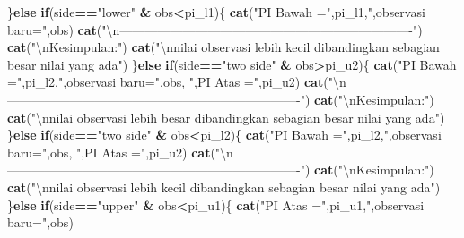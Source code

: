 \documentclass[]{book}
\newenvironment{Shaded}{\begin{snugshade}}{\end{snugshade}}
\newcommand{\KeywordTok}[1]{\textcolor[rgb]{0.13,0.29,0.53}{\textbf{#1}}}
\newcommand{\CharTok}[1]{\textcolor[rgb]{0.31,0.60,0.02}{#1}}
\newcommand{\StringTok}[1]{\textcolor[rgb]{0.31,0.60,0.02}{#1}}
\newcommand{\ControlFlowTok}[1]{\textcolor[rgb]{0.13,0.29,0.53}{\textbf{#1}}}
\newcommand{\OperatorTok}[1]{\textcolor[rgb]{0.81,0.36,0.00}{\textbf{#1}}}
\newcommand{\NormalTok}[1]{#1}
\begin{document}
\begin{Shaded}
\begin{Highlighting}[]
\NormalTok{  \}}\ControlFlowTok{else} \ControlFlowTok{if}\NormalTok{(side}\OperatorTok{==}\StringTok{"lower"} \OperatorTok{&}\StringTok{ }\NormalTok{obs}\OperatorTok{<}\NormalTok{pi_l1)\{}
    \KeywordTok{cat}\NormalTok{(}\StringTok{"PI Bawah ="}\NormalTok{,pi_l1,}\StringTok{",observasi baru="}\NormalTok{,obs)}
    \KeywordTok{cat}\NormalTok{(}\StringTok{"}\CharTok{\textbackslash{}n}\StringTok{----------------------------------------------------------------------"}\NormalTok{)}
    \KeywordTok{cat}\NormalTok{(}\StringTok{"}\CharTok{\textbackslash{}n}\StringTok{Kesimpulan:"}\NormalTok{)}
    \KeywordTok{cat}\NormalTok{(}\StringTok{"}\CharTok{\textbackslash{}n}\StringTok{nilai observasi lebih kecil dibandingkan sebagian besar nilai yang ada"}\NormalTok{)}
\NormalTok{  \}}\ControlFlowTok{else} \ControlFlowTok{if}\NormalTok{(side}\OperatorTok{==}\StringTok{"two side"} \OperatorTok{&}\StringTok{ }\NormalTok{obs}\OperatorTok{>}\NormalTok{pi_u2)\{}
    \KeywordTok{cat}\NormalTok{(}\StringTok{"PI Bawah ="}\NormalTok{,pi_l2,}\StringTok{",observasi baru="}\NormalTok{,obs, }\StringTok{",PI Atas ="}\NormalTok{,pi_u2)}
    \KeywordTok{cat}\NormalTok{(}\StringTok{"}\CharTok{\textbackslash{}n}\StringTok{----------------------------------------------------------------------"}\NormalTok{)}
    \KeywordTok{cat}\NormalTok{(}\StringTok{"}\CharTok{\textbackslash{}n}\StringTok{Kesimpulan:"}\NormalTok{)}
    \KeywordTok{cat}\NormalTok{(}\StringTok{"}\CharTok{\textbackslash{}n}\StringTok{nilai observasi lebih besar dibandingkan sebagian besar nilai yang ada"}\NormalTok{)}
\NormalTok{  \}}\ControlFlowTok{else} \ControlFlowTok{if}\NormalTok{(side}\OperatorTok{==}\StringTok{"two side"} \OperatorTok{&}\StringTok{ }\NormalTok{obs}\OperatorTok{<}\NormalTok{pi_l2)\{}
    \KeywordTok{cat}\NormalTok{(}\StringTok{"PI Bawah ="}\NormalTok{,pi_l2,}\StringTok{",observasi baru="}\NormalTok{,obs, }\StringTok{",PI Atas ="}\NormalTok{,pi_u2)}
    \KeywordTok{cat}\NormalTok{(}\StringTok{"}\CharTok{\textbackslash{}n}\StringTok{----------------------------------------------------------------------"}\NormalTok{)}
    \KeywordTok{cat}\NormalTok{(}\StringTok{"}\CharTok{\textbackslash{}n}\StringTok{Kesimpulan:"}\NormalTok{)}
    \KeywordTok{cat}\NormalTok{(}\StringTok{"}\CharTok{\textbackslash{}n}\StringTok{nilai observasi lebih kecil dibandingkan sebagian besar nilai yang ada"}\NormalTok{)}
\NormalTok{  \}}\ControlFlowTok{else} \ControlFlowTok{if}\NormalTok{(side}\OperatorTok{==}\StringTok{"upper"} \OperatorTok{&}\StringTok{ }\NormalTok{obs}\OperatorTok{<}\NormalTok{pi_u1)\{}
    \KeywordTok{cat}\NormalTok{(}\StringTok{"PI Atas ="}\NormalTok{,pi_u1,}\StringTok{",observasi baru="}\NormalTok{,obs)}

\end{Highlighting}
\end{Shaded}
\end{document}
